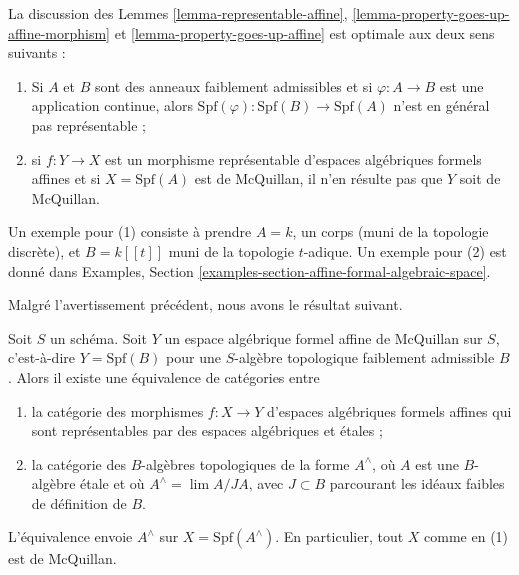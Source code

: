 \begin{remark}[Avertissement]
\label{remark-warning}
La discussion des Lemmes \ref{lemma-representable-affine},
\ref{lemma-property-goes-up-affine-morphism} et
\ref{lemma-property-goes-up-affine}
est optimale aux deux sens suivants :
\begin{enumerate}
\item Si $A$ et $B$ sont des anneaux faiblement admissibles et si $\varphi : A \to B$
est une application continue, alors
$\text{Spf}(\varphi) : \text{Spf}(B) \to \text{Spf}(A)$ n'est en général
pas représentable ;
\item si $f : Y \to X$ est un morphisme représentable d'espaces algébriques
formels affines et si $X = \text{Spf}(A)$ est de McQuillan,
il n'en résulte pas que $Y$ soit de McQuillan.
\end{enumerate}
Un exemple pour (1) consiste à prendre $A = k$, un corps (muni de la topologie discrète),
et $B = k[[t]]$ muni de la topologie $t$-adique.
Un exemple pour (2) est donné dans
Examples, Section \ref{examples-section-affine-formal-algebraic-space}.
\end{remark}

\noindent
Malgré l'avertissement précédent, nous avons le résultat suivant.

\begin{lemma}
\label{lemma-etale}
Soit $S$ un schéma. Soit $Y$ un espace algébrique formel affine de McQuillan
sur $S$, c'est-à-dire $Y = \text{Spf}(B)$ pour une $S$-algèbre topologique
faiblement admissible $B$. Alors il existe une équivalence de catégories entre
\begin{enumerate}
\item la catégorie des morphismes $f : X \to Y$
d'espaces algébriques formels affines qui sont représentables
par des espaces algébriques et étales ;
\item la catégorie des $B$-algèbres topologiques de la forme
$A^\wedge$, où $A$ est une $B$-algèbre étale et où
$A^\wedge = \lim A/JA$, avec $J \subset B$ parcourant les
idéaux faibles de définition de $B$.
\end{enumerate}
L'équivalence envoie $A^\wedge$ sur $X = \text{Spf}(A^\wedge)$.
En particulier, tout $X$ comme en (1) est de McQuillan.
\end{lemma}


